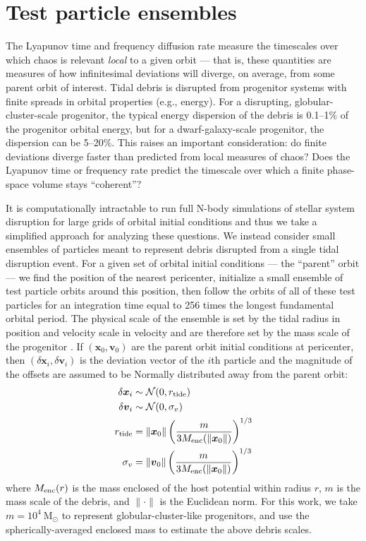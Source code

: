 \documentclass[letterpaper,12pt,preprint]{aastex}
\newcommand{\msun}{\mathrm{M}_\odot}
\newcommand{\bs}[1]{\boldsymbol{#1}}
\begin{document}
\section{Test particle ensembles} \label{sec:ensemble}

The Lyapunov time and frequency diffusion rate measure the timescales over which chaos is relevant \emph{local} to a given orbit --- that is, these quantities are measures of how infinitesimal deviations will diverge, on average, from some parent orbit of interest. Tidal debris is disrupted from progenitor systems with finite spreads in orbital properties (e.g., energy). For a disrupting, globular-cluster-scale progenitor, the typical energy dispersion of the debris is 0.1--1\% of the progenitor orbital energy, but for a dwarf-galaxy-scale progenitor, the dispersion can be 5--20\%. This raises an important consideration: do finite deviations diverge faster than predicted from local measures of chaos? Does the Lyapunov time or frequency rate predict the timescale over which a finite phase-space volume stays ``coherent''?

It is computationally intractable to run full N-body simulations of stellar system disruption for large grids of orbital initial conditions and thus we take a simplified approach for analyzing these questions. We instead consider small ensembles of particles meant to represent debris disrupted from a single tidal disruption event. For a given set of orbital initial conditions --- the ``parent'' orbit --- we find the position of the nearest pericenter, initialize a small ensemble of test particle orbits around this position, then follow the orbits of all of these test particles for an integration time equal to 256 times the longest fundamental orbital period. The physical scale of the ensemble is set by the tidal radius in position and velocity scale in velocity and are therefore set by the mass scale of the progenitor \citep[e.g.,][]{johnston98, apw14}. If $(\bs{x}_0,\bs{v}_0)$ are the parent orbit initial conditions at pericenter, then $(\delta\bs{x}_i,\delta\bs{v}_i)$ is the deviation vector of the $i$th particle and the magnitude of the offsets are assumed to be Normally distributed away from the parent orbit:
\begin{align}
	\delta\bs{x}_i &\sim \mathcal{N}(0, r_{\rm tide})\\
	\delta\bs{v}_i &\sim \mathcal{N}(0, \sigma_v)\\
	r_{\rm tide} &= \|\bs{x}_0\| \left(\frac{m}{3M_{\rm enc}(\|\bs{x}_0\|)}\right)^{1/3} \\
	\sigma_v &= \|\bs{v}_0\|\left(\frac{m}{3M_{\rm enc}(\|\bs{x}_0\|)}\right)^{1/3} 
\end{align}
where $M_{\rm enc}(r)$ is the mass enclosed of the host potential within radius $r$, $m$ is the mass scale of the debris, and $\|\cdot \|$ is the Euclidean norm. For this work, we take $m=10^4~\msun$ to represent globular-cluster-like progenitors, and use the spherically-averaged enclosed mass to estimate the above debris scales.
\end{document}
